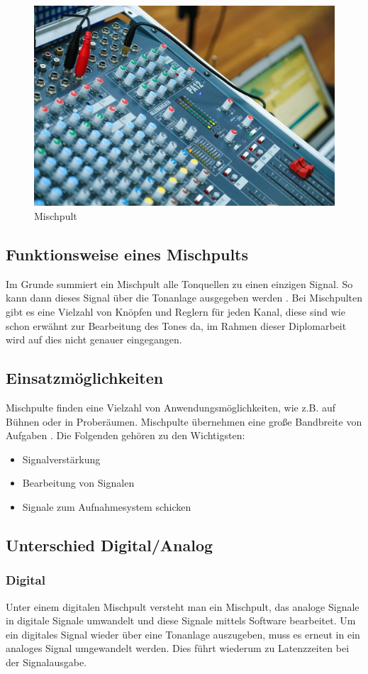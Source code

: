 \begin{figure}[H]
	\centering
	\includegraphics[width=0.6\linewidth]{images/mischpult.jpg}
	\caption[Mischpult]{Mischpult}
	\label{fig:Mischpult}
\end{figure}

\subsection{Funktionsweise eines Mischpults}
Im Grunde summiert ein Mischpult alle Tonquellen zu einen einzigen Signal. So kann dann dieses Signal über die Tonanlage ausgegeben werden \parencite{MischpultErklaerung}. Bei Mischpulten gibt es eine Vielzahl von Knöpfen und Reglern für jeden Kanal, diese sind wie schon erwähnt zur Bearbeitung des Tones da, im Rahmen dieser Diplomarbeit wird auf dies nicht genauer eingegangen. \\

\newpage
\subsection{Einsatzmöglichkeiten}
Mischpulte finden eine Vielzahl von Anwendungsmöglichkeiten, wie z.B. auf Bühnen oder in Proberäumen. Mischpulte übernehmen eine große Bandbreite von Aufgaben \parencite{MischpultVerwendungszweck}. Die Folgenden gehören zu den Wichtigsten:
\begin{itemize}
	\item Signalverstärkung
	\item Bearbeitung von Signalen
	\item Signale zum Aufnahmesystem schicken
\end{itemize}


\subsection{Unterschied Digital/Analog}
\subsubsection{Digital}
Unter einem digitalen Mischpult versteht man ein Mischpult, das analoge Signale in digitale Signale umwandelt und diese Signale mittels Software bearbeitet. Um ein digitales Signal wieder über eine Tonanlage auszugeben, muss es erneut in ein analoges Signal umgewandelt werden. Dies führt wiederum zu Latenzzeiten bei der Signalausgabe.
